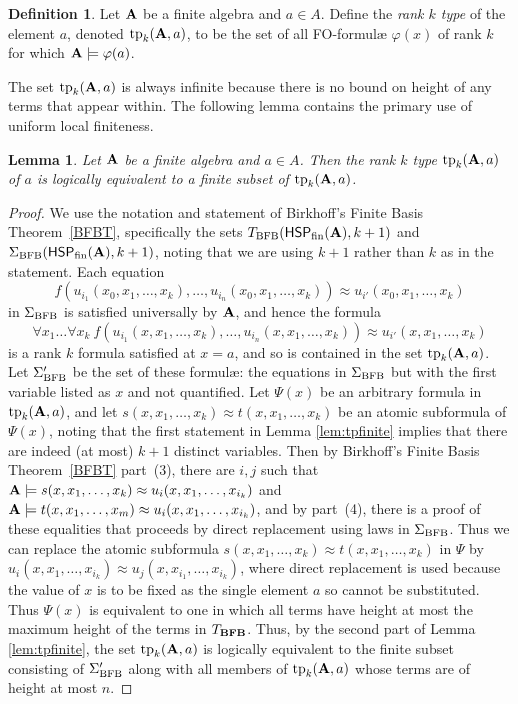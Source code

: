 \documentclass[reqno]{amsart}
\theoremstyle{plain}
\newtheorem{lem}[thm]{Lemma}
\theoremstyle{definition}
\newtheorem{defn}[thm]{Definition}
\newcommand{\tp}{\operatorname{tp}}
\begin{document}
\begin{defn}
Let ${\bf A}$ be a finite algebra and $a\in A$. Define the \emph{rank $k$ type} of the element $a$, denoted $\tp_k({\bf A},a)$, to be the set of all  FO-formul{\ae} $\varphi(x)$ of rank $k$ for which ${\bf A}\models \varphi(a)$.
\end{defn}
The set $\tp_k({\bf A},a)$ is always infinite because there is no bound on height of any terms that appear within.  The following lemma contains the primary use of uniform local finiteness.
\begin{lem}\label{lem:finsubset}
Let ${\bf A}$ be a finite algebra and $a\in A$.  Then the rank $k$ type $\tp_k({\bf A},a)$ of $a$ is logically equivalent to a finite subset of $\tp_k({\bf A},a)$.
\end{lem}
\begin{proof}
We use the notation and statement of Birkhoff's Finite Basis Theorem~\ref{BFBT}, specifically the sets $T_{\rm BFB}(\mathsf{HSP}_{\rm fin}({\bf A}),k+1)$ and $\Sigma_{\rm BFB}(\mathsf{HSP}_{\rm fin}({\bf A}),k+1)$, noting that we are using $k+1$ rather than $k$ as in the statement.   Each equation 
\[
f(u_{i_1}(x_0,x_1,\dots,x_k),\dots, u_{i_n}(x_0,x_1,\dots,x_k))\approx u_{i'}(x_0,x_1,\dots,x_k)
\]
 in $\Sigma_{\rm BFB}$ is satisfied universally by ${\bf A}$, and hence the formula 
 \[
 \forall x_1\dots \forall x_k\ f(u_{i_1}(x,x_1,\dots,x_k),\dots, u_{i_n}(x,x_1,\dots,x_k))\approx u_{i'}(x,x_1,\dots,x_k)
 \]
  is a rank $k$ formula satisfied at $x=a$, and so is contained in the set $\tp_k({\bf A},a)$.   Let $\Sigma_{\rm BFB}'$ be the set of these formul{\ae}: the equations in $\Sigma_{\rm BFB}$ but with the first variable listed as $x$ and not quantified. Let $\Psi(x)$ be an arbitrary formula in $\tp_k({\bf A},a)$, and let $s(x,x_1,\dots,x_k)\approx t(x,x_1,\dots,x_k)$ be an atomic subformula of $\Psi(x)$, noting that the first statement in Lemma \ref{lem:tpfinite} implies that there are indeed (at most) $k+1$ distinct variables.   Then by Birkhoff's Finite Basis Theorem~\ref{BFBT} part~(3), there are $i,j$ such that  ${\bf A}\models s(x,x_1,\dots,x_k)\approx u_i(x,x_1,\dots,x_{i_k})$ and ${\bf A}\models t(x,x_1,\dots,x_m)\approx u_i(x,x_1,\dots,x_{i_k})$, and by part~(4), there is a proof of these equalities that proceeds by direct replacement using laws in $\Sigma_{\rm BFB}$.   Thus we can replace the atomic subformula $s(x,x_1,\dots,x_k)\approx t(x,x_1,\dots,x_k)$ in $\Psi$ by $u_i(x,x_1,\dots,x_{i_k})\approx u_j(x,x_{i_1},\dots,x_{i_k})$, where direct replacement is used because the value of $x$ is to be fixed as the single element $a$ so cannot be substituted.  Thus $\Psi(x)$ is equivalent to one in which all terms have height at most the maximum height of the terms in $T_{\bf BFB}$.  Thus, by the second part of Lemma \ref{lem:tpfinite}, the set $\tp_k({\bf A},a)$ is logically equivalent to the finite subset consisting of $\Sigma_{\rm BFB}'$ along with all members of $\tp_k({\bf A},a)$ whose terms are of height at most $n$. 
\end{proof}
\end{document}
